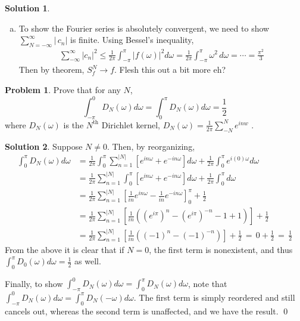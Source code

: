 \documentclass[10pt]{article}
\theoremstyle{plain}
\theoremstyle{definition}
\newtheorem{prob}{Problem}
\newtheorem*{soln*}{Solution}
\numberwithin{equation}{section}
\begin{document}
\begin{soln*}
\begin{enumerate}[(a)]
        \item
            To show the Fourier series is absolutely convergent, we need to show
            $\displaystyle \sum_{N=-\infty}^\infty \left|\,{c_n} \right|$ is finite. 
            Using Bessel's inequality,
            \begin{align*}
                \sum_{-\infty}^{\infty}|c_n|^2
                    \leq \frac{1}{2\pi} \int_{-\pi}^{\pi} | f(\omega) |^2 d\omega
                    =\frac{1}{2\pi} \int_{-\pi}^{\pi} \omega^2 \,d\omega = \cdots = \frac{\pi^2}{3}
                \end{align*}
            Then by theorem, $S_f^N \rightarrow f$. Flesh this out a bit more eh?
    \end{enumerate}
\end{soln*}

\hrulefill

\begin{prob}
    Prove that for any $N$,
    \[
            \int_{-\pi}^0  D_N(\omega) d\omega
        =   \int_{0}^{\pi}  D_N(\omega) d\omega = \frac{1}{2}
    \]
    where $D_N(\omega)$ is the $N^{\text{th}}$ Dirichlet kernel,
    $\displaystyle D_N(\omega) = \frac{1}{2\pi}\sum_{-N}^N e^{inw}$\,\,.
\end{prob}
\begin{soln*}
    Suppose $N\neq 0$. Then, by reorganizing,
    \begin{align*}
        \int_0^\pi D_N(\omega)d\omega &=
        \frac{1}{2\pi} \int_0^\pi \sum_{n=1}^{|N|}\left[
        e^{in\omega} + e^{-in\omega}\right] d\omega + \frac{1}{2\pi}\int_0^\pi e^{i(0)\omega} d\omega \\
        &= \frac{1}{2\pi} \sum_{n=1}^{|N|}\int_0^\pi \left[
        e^{in\omega} + e^{-in\omega}\right] d\omega + \frac{1}{2\pi}\int_0^\pi d\omega \\
        &= \frac{1}{2\pi} \sum_{n=1}^{|N|}
            \left[ \frac{1}{in} e^{in\omega} -\frac{1}{in} e^{-in\omega}\right]_0^\pi
            + \frac{1}{2} \\ 
        &= \frac{1}{2\pi} \sum_{n=1}^{|N|}
            \left[ \frac{1}{in}\left(
            \left(e^{i\pi}\right)^n - \left(e^{i\pi}\right)^{-n} - 1 + 1
        \right)\right] + \frac{1}{2}\\
        &= \frac{1}{2\pi} \sum_{n=1}^{|N|}
        \left[ \frac{1}{in}\left( (-1)^n - (-1)^{-n}\right)\right] + \frac{1}{2} 
        \,=\, 0 + \frac{1}{2} \,=\, \frac{1}{2}
    \end{align*}
    From the above it is clear that if $N=0$, the first term is nonexistent, and thus
    $\int_0^\pi D_0(\omega) d\omega = \frac{1}{2}$ as well.

    Finally, to show $\int_{-\pi}^0  D_N(\omega) d\omega =   \int_{0}^{\pi}  D_N(\omega) d\omega$,
    note that $\int_{-\pi}^{0} D_N(\omega) d\omega = \int_0^\pi D_N(-\omega) d\omega$.
    The first term is simply reordered and still cancels out, whereas the second term is unaffected,
    and we have the result.
    \qed
\end{soln*}
\end{document}
